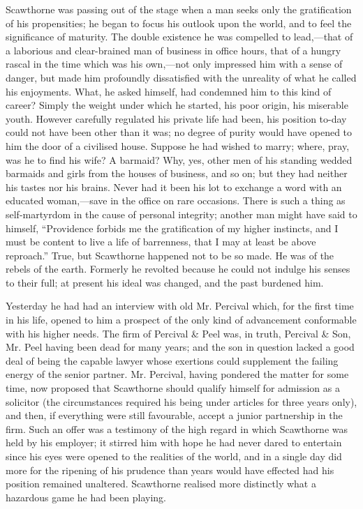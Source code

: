 Scawthorne was passing out of the stage when a man seeks only the
gratification of his {}propensities; he began to focus his outlook upon
the world, and to feel the significance of maturity. The double
existence he was compelled to lead,---that of a laborious and
clear-brained man of business in office hours, that of a hungry rascal
in the time which was his own,---not only impressed him with a sense of
danger, but made him profoundly dissatisfied with the unreality of what
he called his enjoyments. What, he asked himself, had condemned him to
this kind of career? Simply the weight under which he started, his poor
origin, his miserable youth. However carefully regulated his private
life had been, his position to-day could not have been other than it
was; no degree of purity would have opened to him the door of a
civilised house. Suppose he had wished to marry; where, pray, was he to
find his wife? A barmaid? Why, yes, other men of his standing wedded
barmaids and girls from the houses of business, and so on; but they had
neither his tastes nor his brains. Never had it been his lot to exchange
a word with an educated woman,---save in the office on rare occasions.
There is such a thing as self-martyrdom in the cause of personal
integrity; {}another man might have said to himself, ``Providence
forbids me the gratification of my higher instincts, and I must be
content to live a life of barrenness, that I may at least be above
reproach.'' True, but Scawthorne happened not to be so made. He was of
the rebels of the earth. Formerly he revolted because he could not
indulge his senses to their full; at present his ideal was changed, and
the past burdened him.

Yesterday he had had an interview with old Mr. Percival which, for the
first time in his life, opened to him a prospect of the only kind of
advancement conformable with his higher needs. The firm of Percival \&
Peel was, in truth, Percival \& Son, Mr. Peel having been dead for many
years; and the son in question lacked a good deal of being the capable
lawyer whose exertions could supplement the failing energy of the senior
partner. Mr. Percival, having pondered the matter for some time, now
proposed that Scawthorne should qualify himself for admission as a
solicitor (the circumstances required his being under articles for three
years only), and then, if everything were still favourable, accept a
junior partnership in {}the firm. Such an offer was a testimony of the
high regard in which Scawthorne was held by his employer; it stirred him
with hope he had never dared to entertain since his eyes were opened to
the realities of the world, and in a single day did more for the
ripening of his prudence than years would have effected had his position
remained unaltered. Scawthorne realised more distinctly what a hazardous
game he had been playing.

